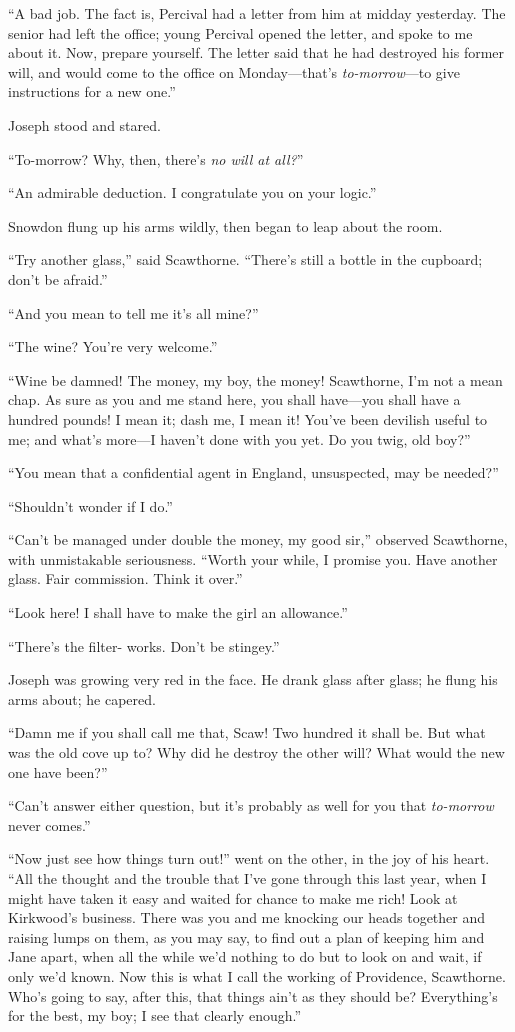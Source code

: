 ``A bad job. The fact is, Percival had a letter from him at midday
yesterday. The senior had left the office; young Percival opened the
letter, and spoke to me about it. Now, prepare yourself. The letter said
that he had destroyed his former will, and would come to the office on
Monday---that's \emph{to-morrow}---to give instructions for a new one.''

Joseph stood and stared.

``To-morrow? Why, then, there's \emph{no will at all?}''

``An admirable deduction. I congratulate you on your logic.''

Snowdon flung up his arms wildly, then began to leap about the room.

``Try another glass,'' said Scawthorne. ``There's still a bottle in the
cupboard; don't be afraid.''

``And you mean to tell me it's all mine?''

``The wine? You're very welcome.''

{}``Wine be damned! The money, my boy, the money! Scawthorne, I'm not a
mean chap. As sure as you and me stand here, you shall have---you shall
have a hundred pounds! I mean it; dash me, I mean it! You've been
devilish useful to me; and what's more---I haven't done with you yet. Do
you twig, old boy?''

``You mean that a confidential agent in England, unsuspected, may be
needed?''

``Shouldn't wonder if I do.''

``Can't be managed under double the money, my good sir,'' observed
Scawthorne, with unmistakable seriousness. ``Worth your while, I promise
you. Have another glass. Fair commission. Think it over.''

``Look here! I shall have to make the girl an allowance.''

``There's the filter- works. Don't be stingey.''

Joseph was growing very red in the face. He drank glass after glass; he
flung his arms about; he capered.

``Damn me if you shall call me that, Scaw! Two hundred it shall be. But
what was the old cove up to? Why did he destroy the other will? What
would the new one have been?''

{}``Can't answer either question, but it's probably as well for you that
\emph{to-morrow} never comes.''

``Now just see how things turn out!'' went on the other, in the joy of
his heart. ``All the thought and the trouble that I've gone through this
last year, when I might have taken it easy and waited for chance to make
me rich! Look at Kirkwood's business. There was you and me knocking our
heads together and raising lumps on them, as you may say, to find out a
plan of keeping him and Jane apart, when all the while we'd nothing to
do but to look on and wait, if only we'd known. Now this is what I call
the working of Providence, Scawthorne. Who's going to say, after this,
that things ain't as they should be? Everything's for the best, my boy;
I see that clearly enough.''

